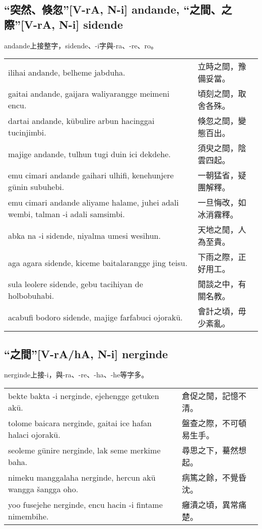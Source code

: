 \documentclass{article}
\begin{document}
\subsection{“突然、倏忽”[V-rA, N-i] andande, “之間、之際”[V-rA, N-i] sidende}
\noindent andande上接整字，sidende、-i字與-ra、-re、ro。
\begin{center}
    \begin{tabularx}{\textwidth}{XX}
        ilihai andande, belheme jabduha. &立時之間，豫備妥當。\\
        gaitai andande, gaijara waliyarangge meimeni encu. & 頃刻之間，取舍各殊。\\
        dartai andande, k\={u}bulire arbun hacinggai tucinjimbi. &倏忽之間，變態百出。\\
        majige andande, tulhun tugi duin ici dekdehe. & 須臾之間，陰雲四起。\\
        emu cimari andande gaihari ulhifi, kenehunjere g\={u}nin subuhebi. & 一朝猛省，疑團解釋。\\
        emu cimari andande aliyame halame, juhei adali wembi, talman -i adali samsimbi. & 一旦悔改，如冰消霧釋。\\
        abka na -i sidende, niyalma umesi wesihun. &天地之閒，人為至貴。\\
        aga agara sidende, kiceme baitalarangge jing teisu. & 下雨之際，正好用工。\\
        sula leolere sidende, gebu tacihiyan de holbobuhabi. & 閒談之中，有關名教。\\
        acabufi bodoro sidende, majige farfabuci ojorak\={u}. & 會計之頃，毋少紊亂。
    \end{tabularx}
\end{center}

\subsection{“之間”[V-rA/hA, N-i] nerginde}
\noindent nerginde上接-i，與-ra、-re、-ha、-he等字多。
\begin{center}
    \begin{tabularx}{\textwidth}{XX}
        bekte bakta -i nerginde, ejehengge getuken ak\={u}. & 倉促之閒，記憶不清。\\
        tolome baicara nerginde, gaitai ice hafan halaci ojorak\={u}. & 盤查之際，不可頓易生手。\\
        seoleme g\={u}nire nerginde, lak seme merkime baha. & 尋思之下，驀然想起。\\
        nimeku manggalaha nerginde, hercun ak\={u} wangga \v{s}angga oho. & 病篤之餘，不覺昏沈。\\
        yoo fusejehe nerginde, encu hacin -i fintame nimembihe. & 癰潰之頃，異常痛楚。
    \end{tabularx}
\end{center}
\end{document}

